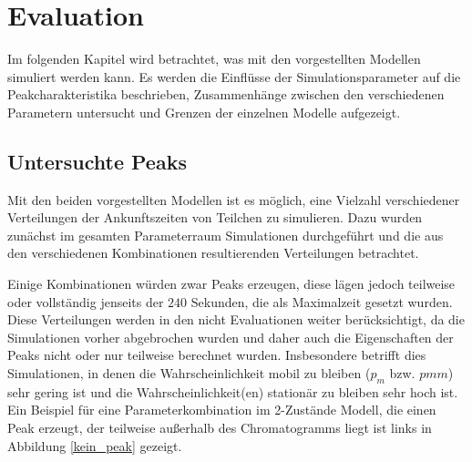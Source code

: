 
\chapter{Evaluation}
\label{chapter:eva}
Im folgenden Kapitel wird betrachtet, was mit den vorgestellten Modellen simuliert werden kann. Es werden die Einflüsse der Simulationsparameter auf die Peakcharakteristika beschrieben, Zusammenhänge zwischen den verschiedenen Parametern untersucht und Grenzen der einzelnen Modelle aufgezeigt.


\section{Untersuchte Peaks}
Mit den beiden vorgestellten Modellen ist es möglich, eine Vielzahl verschiedener Verteilungen der Ankunftszeiten von Teilchen zu simulieren. 
Dazu wurden zunächst im gesamten Parameterraum Simulationen durchgeführt und die aus den verschiedenen Kombinationen resultierenden Verteilungen betrachtet.

Einige Kombinationen würden zwar Peaks erzeugen, diese lägen jedoch teilweise oder vollständig jenseits der $240$ Sekunden, die als Maximalzeit gesetzt wurden. Diese Verteilungen werden in den nicht Evaluationen weiter berücksichtigt, da die Simulationen vorher abgebrochen wurden und daher auch die Eigenschaften der Peaks nicht oder nur teilweise berechnet wurden. Insbesondere betrifft dies Simulationen, in denen die Wahrscheinlichkeit mobil zu bleiben ($p_m$ bzw. $pmm$) sehr gering ist und die Wahrscheinlichkeit(en) stationär zu bleiben sehr hoch ist. Ein Beispiel für eine Parameterkombination im 2-Zustände Modell, die einen Peak erzeugt, der teilweise außerhalb des Chromatogramms liegt ist links in Abbildung \ref{kein_peak} gezeigt.

